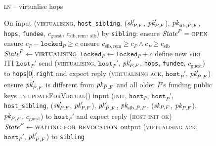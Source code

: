 \begin{figure}[H]
\begin{processbox}{\textsc{ln} -- virtualise hops}
\begin{algorithmic}[1]
      \State On input (\textsc{virtualising}, \texttt{host\_sibling}, ($\textit{sk}_{P,
      F}'$, $\textit{pk}_{P, F}'$), $\textit{pk}_{\mathrm{sib}, \bar{P}, F}$, \texttt{hops},
      \texttt{fundee}, $c_{\mathrm{guest}}$, $c_{\mathrm{sib}, \mathrm{rem}}$,
      $_{\mathrm{sib}}$) by \texttt{sibling}:
      \Indent
        \State ensure $\textit{State}^P = \textsc{open}$
        \State ensure $c_P - \texttt{locked}_P \geq c$
        \State ensure $c_{\mathrm{sib}, \mathrm{rem}} \geq c_P \wedge
        c_{\bar{P}} \geq c_{\mathrm{sib}}$ 
        \State $\textit{State}^P \gets \textsc{virtualising}$
        \State $\texttt{locked}_P \gets \texttt{locked}_P + c$
        \State define new \textsc{virt} ITI $\texttt{host}_P'$
        \State send (\textsc{virtualising}, $\texttt{host}_P'$, $\textit{pk}_{P, F}'$,
        \texttt{hops}, \texttt{fundee}, $c_{\mathrm{guest}}$) to
        \texttt{hops}[0].\texttt{right} and expect reply (\textsc{virtualising
        ack}, $\texttt{host}_{\bar{P}}'$, $\textit{pk}_{\bar{P}, F}'$)
        \State ensure $\textit{pk}_{\bar{P}, F}'$ is different from $\textit{pk}_{\bar{P}, F}$ and
        all older $\bar{P}$'s funding public keys
        \State \textsc{ln}.\textsc{updateForVirtual}()
        \State input (\textsc{init}, $\texttt{host}_P$,
        $\texttt{host}_{\bar{P}}'$, \texttt{host\_sibling}, ($\textit{sk}_{P, F}'$,
        $\textit{pk}_{P, F}'$), $\textit{pk}_{\bar{P}, F}'$, $\textit{pk}_{\mathrm{sib}, \bar{P}, F}$,
        ($\textit{sk}_{P, F}$, $\textit{pk}_{P, F}$), $\textit{pk}_{\bar{P}, F}$, $c_{\mathrm{guest}}$) to
        $\texttt{host}_P'$ and expect reply (\textsc{host init ok})
        \State $\textit{State}^P \gets \textsc{waiting for revocation}$
        \State output (\textsc{virtualising ack}, $\texttt{host}_P'$,
        $\textit{pk}_{\bar{P}, F}'$) to \texttt{sibling}
      \EndIndent
    \end{algorithmic}
  \end{processbox}
  \caption{}
  \label{code:ln:open:virtualise:hops}
\end{figure}

